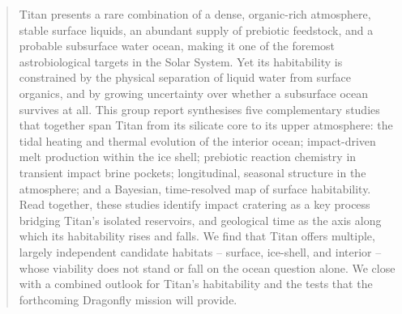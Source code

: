 \begin{abstract}
\noindent
Titan presents a rare combination of a dense, organic-rich atmosphere, stable surface liquids, an
abundant supply of prebiotic feedstock, and a probable subsurface water ocean, making it one of the
foremost astrobiological targets in the Solar System. Yet its habitability is constrained by the
physical separation of liquid water from surface organics, and by growing uncertainty over whether a
subsurface ocean survives at all. This group report synthesises five complementary studies that
together span Titan from its silicate core to its upper atmosphere: the tidal heating and thermal
evolution of the interior ocean; impact-driven melt production within the ice shell; prebiotic
reaction chemistry in transient impact brine pockets; longitudinal, seasonal structure in the
atmosphere; and a Bayesian, time-resolved map of surface habitability. Read together, these studies
identify impact cratering as a key process bridging Titan's isolated reservoirs, and geological time
as the axis along which its habitability rises and falls. We find that Titan offers multiple, largely
independent candidate habitats -- surface, ice-shell, and interior -- whose viability does not stand
or fall on the ocean question alone. We close with a combined outlook for Titan's habitability and the
tests that the forthcoming Dragonfly mission will provide.
\end{abstract}
